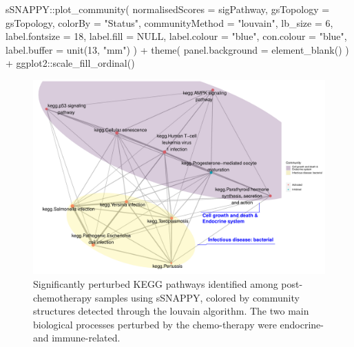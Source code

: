 \documentclass[9pt,a4paper,]{extarticle}
\newenvironment{Shaded}{\begin{snugshade}}{\end{snugshade}}
\newcommand{\AttributeTok}[1]{\textcolor[rgb]{0.77,0.63,0.00}{#1}}
\newcommand{\ConstantTok}[1]{\textcolor[rgb]{0.00,0.00,0.00}{#1}}
\newcommand{\DecValTok}[1]{\textcolor[rgb]{0.00,0.00,0.81}{#1}}
\newcommand{\FunctionTok}[1]{\textcolor[rgb]{0.00,0.00,0.00}{#1}}
\newcommand{\NormalTok}[1]{#1}
\newcommand{\SpecialCharTok}[1]{\textcolor[rgb]{0.00,0.00,0.00}{#1}}
\newcommand{\StringTok}[1]{\textcolor[rgb]{0.31,0.60,0.02}{#1}}
\begin{document}
\begin{Shaded}
\begin{Highlighting}[]
\NormalTok{sSNAPPY}\SpecialCharTok{::}\FunctionTok{plot\_community}\NormalTok{(}
    \AttributeTok{normalisedScores =}\NormalTok{ sigPathway, }
    \AttributeTok{gsTopology =}\NormalTok{ gsTopology, }
    \AttributeTok{colorBy =} \StringTok{"Status"}\NormalTok{, }
    \AttributeTok{communityMethod =} \StringTok{"louvain"}\NormalTok{, }
    \AttributeTok{lb\_size =} \DecValTok{6}\NormalTok{, }
    \AttributeTok{label.fontsize =} \DecValTok{18}\NormalTok{,}
    \AttributeTok{label.fill =} \ConstantTok{NULL}\NormalTok{,}
    \AttributeTok{label.colour =} \StringTok{"blue"}\NormalTok{,}
    \AttributeTok{con.colour =} \StringTok{"blue"}\NormalTok{,}
    \AttributeTok{label.buffer =} \FunctionTok{unit}\NormalTok{(}\DecValTok{13}\NormalTok{, }\StringTok{"mm"}\NormalTok{)}
\NormalTok{) }\SpecialCharTok{+}
    \FunctionTok{theme}\NormalTok{(}
        \AttributeTok{panel.background =} \FunctionTok{element\_blank}\NormalTok{()}
\NormalTok{    ) }\SpecialCharTok{+}
\NormalTok{    ggplot2}\SpecialCharTok{::}\FunctionTok{scale\_fill\_ordinal}\NormalTok{()}
\end{Highlighting}
\end{Shaded}

\begin{figure}

{\centering \includegraphics[width=0.8\linewidth]{sSNAPPY_paper_files/figure-latex/Figure3-1} 

}

\caption{Significantly perturbed KEGG pathways identified among post-chemotherapy samples using sSNAPPY, colored by community structures detected through the louvain algorithm. The two main biological processes perturbed by the chemo-therapy were endocrine- and immune-related.}\label{fig:Figure3}
\end{figure}
\end{document}
